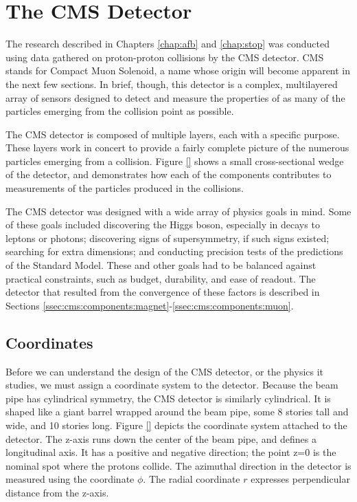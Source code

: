 \section{The CMS Detector}
\label{sec:cms}

The research described in Chapters \ref{chap:afb} and \ref{chap:stop}
was conducted using data gathered on proton-proton collisions by the
CMS detector. CMS stands for Compact Muon Solenoid, a name whose
origin will become apparent in the next few sections. In brief, though,
this detector is a complex, multilayered array of sensors designed to
detect and measure the properties of as many of the particles emerging
from the collision point as possible.


The CMS detector is composed of multiple layers, each with a specific
purpose. These layers work in concert to provide a fairly complete
picture of the numerous particles emerging from a collision.
Figure \ref{} shows a small cross-sectional wedge
of the detector, and demonstrates how each of the components
contributes to measurements of the particles produced in the
collisions.

The CMS detector was designed with a wide array of physics goals in
mind. Some of these goals included discovering the Higgs boson,
especially in decays to leptons or photons; discovering signs of
supersymmetry, if such signs existed; searching for extra
dimensions; and conducting precision tests of the predictions of the Standard Model.
These and other goals had to be balanced against practical
constraints, such as budget, durability, and ease of readout. The
detector that resulted from the convergence of these factors is
described in Sections
\ref{ssec:cms:components:magnet}-\ref{ssec:cms:components:muon}.

\subsection{Coordinates}
\label{ssec:cms:coordinates}


Before we can understand the design of the CMS detector, or the
physics it studies, we must assign a coordinate system to the detector.
Because the beam pipe has cylindrical symmetry, the CMS detector is
similarly cylindrical. It is shaped like a giant barrel wrapped around
the beam pipe, some 8 stories tall and wide, and 10 stories %
long. Figure \ref{} depicts the coordinate system attached to the
detector. The z-axis runs down the center of the beam pipe, and
defines a longitudinal axis. It has a positive and negative direction;
the point z=0 is the nominal spot where the protons collide. The
azimuthal direction in the detector is measured using the coordinate
$\phi$. The radial coordinate $r$ expresses perpendicular distance from the z-axis.

